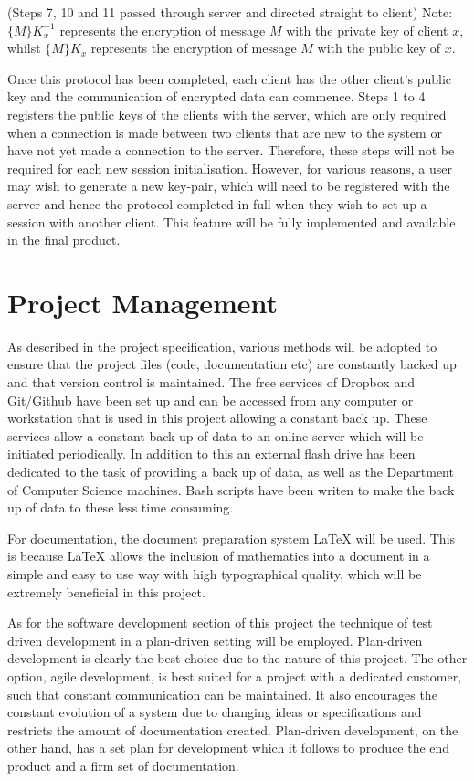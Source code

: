 \documentclass[a4paper,11pt]{article}
\begin{document}
(Steps 7, 10 and 11 passed through server and directed straight to client)
Note: $ \{M\}K_{x}^{-1} $ represents the encryption of message $ M $ with the private key of client $ x $, whilst $ \{M\}K_{x} $ represents the encryption of message $ M $ with the public key of $ x $.

Once this protocol has been completed, each client has the other client’s public key and the communication of encrypted data can commence. Steps 1 to 4 registers the public keys of the clients with the server, which are only required when a connection is made between two clients that are new to the system or have not yet made a connection to the server. Therefore, these steps will not be required for each new session initialisation. However, for various reasons, a user may wish to generate a new key-pair, which will need to be registered with the server and hence the protocol completed in full when they wish to set up a session with another client. This feature will be fully implemented and available in the final product. 

\section{Project Management}

As described in the project specification, various methods will be adopted to ensure that the project files (code, documentation etc) are constantly backed up and that version control is maintained. The free services of Dropbox and Git/Github have been set up and can be accessed from any computer or workstation that is used in this project allowing a constant back up. These services allow a constant back up of data to an online server which will be initiated periodically. In addition to this an external flash drive has been dedicated to the task of providing a back up of data, as well as the Department of Computer Science machines. Bash scripts have been writen to make the back up of data to these less time consuming.

For documentation, the document preparation system LaTeX will be used. This is because LaTeX allows the inclusion of mathematics into a document in a simple and easy to use way with high typographical quality, which will be extremely beneficial in this project. 

As for the software development section of this project the technique of test driven development in a plan-driven setting will be employed. Plan-driven development is clearly the best choice due to the nature of this project. The other option, agile development, is best suited for a project with a dedicated customer, such that constant communication can be maintained. It also encourages the constant evolution of a system due to changing ideas or specifications and restricts the amount of documentation created. Plan-driven development, on the other hand, has a set plan for development which it follows to produce the end product and a firm set of documentation. 
\end{document}
